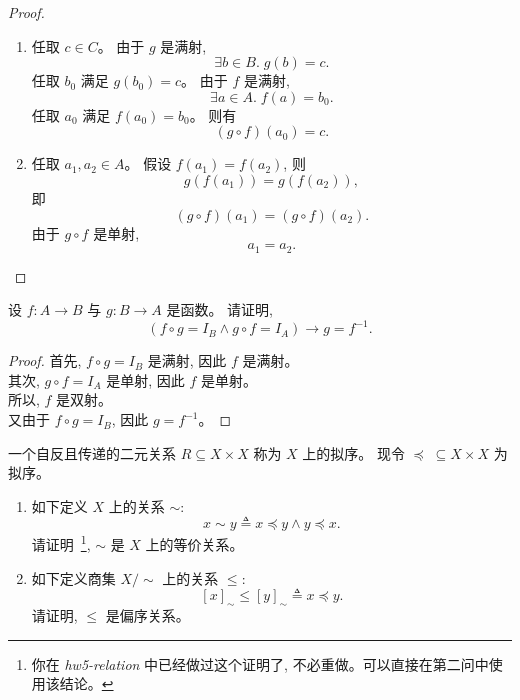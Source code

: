 \documentclass[a4paper, justified]{tufte-handout}
\begin{document}
\begin{proof}
  \begin{enumerate}[(1)]
    \item 任取 $c \in C$。
      由于 $g$ 是满射,
      \[
        \exists b \in B.\; g(b) = c.
      \]
      任取 $b_{0}$ 满足 $g(b_{0}) = c$。
      由于 $f$ 是满射,
      \[
        \exists a \in A.\; f(a) = b_{0}.
      \]
      任取 $a_{0}$ 满足 $f(a_{0}) = b_{0}$。
      则有
      \[
        (g \circ f)(a_{0}) = c.
      \]
    \item 任取 $a_{1}, a_{2} \in A$。
      假设 $f(a_{1}) = f(a_{2})$, 则
      \[
        g(f(a_{1})) = g(f(a_{2})),
      \]
      即
      \[
        (g \circ f)(a_{1}) = (g \circ f)(a_{2}).
      \]
      由于 $g \circ f$ 是单射,
      \[
        a_{1} = a_{2}.
      \]
  \end{enumerate}
\end{proof}

\begin{problem}
  设 $f: A \to B$ 与 $g: B \to A$ 是函数。
  请证明,
  \[
    (f \circ g = I_B \land g \circ f = I_A) \to g = f^{-1}.
  \]
\end{problem}

\begin{proof}
  首先, $f \circ g = I_{B}$ 是满射, 因此 $f$ 是满射。\\
  其次, $g \circ f = I_{A}$ 是单射, 因此 $f$ 是单射。\\
  所以, $f$ 是双射。\\
  又由于 $f \circ g = I_{B}$, 因此 $g = f^{-1}$。
\end{proof}

\begin{problem}[\score{4 = 0 + 4} $\star\star\star$]
  一个自反且传递的二元关系 $R \subseteq X \times X$
  称为 $X$ 上的拟序。
  现令 $\preceq\; \subseteq X \times X$ 为拟序。

  \begin{enumerate}[(1)]
    \item 如下定义 $X$ 上的关系 $\sim$:
      \[
        x \sim y \triangleq x \preceq y \land y \preceq x.
      \]
      请证明~\footnote{你在 \textsl{hw5-relation} 中已经做过这个证明了,
      不必重做。可以直接在第二问中使用该结论。}, $\sim$ 是 $X$ 上的等价关系。
    \item 如下定义商集 $X/\sim$ 上的关系 $\le$:
      \[
        [x]_{\sim} \le [y]_{\sim} \triangleq x \preceq y.
      \]
      请证明, $\le$ 是偏序关系。
  \end{enumerate}
\end{problem}
\end{document}
